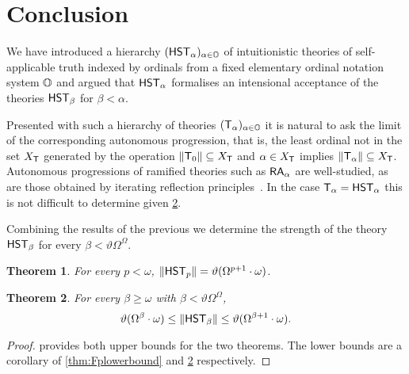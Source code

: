 \documentclass[UKenglish,cleveref,DIV=12]{scrartcl}
\newtheorem{theorem}{Theorem}
\theoremstyle{definition}
\theoremstyle{definition}
\begin{document}
\section{Conclusion}\label{sec:conc}

We have introduced a hierarchy  \( ( \mathsf{HST}_\alpha )_{\alpha \in \mathbb{O} } \) of intuitionistic theories of self-applicable truth indexed by ordinals from a fixed elementary ordinal notation system \( \mathbb{O} \) and argued that \( \mathsf{HST}_{\alpha} \) formalises an intensional acceptance of the theories \( \mathsf{HST}_{\beta} \) for \( \beta < \alpha \).

Presented with such a hierarchy of theories $ ( \mathsf{T}_\alpha )_{\alpha\in\mathbb{O} }$ it is natural to ask the limit of the corresponding
autonomous progression, that is, the least ordinal not in the set $X_{\mathsf{T}}$ generated by the operation $\lVert{\mathsf{T}_0}\rVert\subseteq X_{\mathsf{T}}$ and
$\alpha\in X_{\mathsf{T}}$ implies $\lVert{\mathsf{T}_\alpha}\rVert\subseteq X_{\mathsf{T}}$. 
Autonomous progressions of ramified theories such as $\mathsf{RA}_\alpha$ are well-studied, as are those obtained by
iterating reflection principles~\cite{XX}.
In the case $\mathsf{T}_\alpha=\mathsf{HST}_\alpha$ this is not difficult to determine
given \cref{thm:Fbetastrength}.

Combining the results of the previous  we determine
the strength of the theory $\mathsf{HST}_\beta$ for every $\beta<\vartheta\Omega^\Omega$.
%
\begin{theorem}\label{thm:Fpstrength}
 For every $p<\omega$,
 \(
  \lVert{\mathsf{HST}_p}\rVert=\vartheta(\Omega^{p+1}\cdot\omega)
 \).
\end{theorem}
%
\begin{theorem}\label{thm:Fbetastrength}
 For every $\beta\ge\omega$ with $\beta<\vartheta\Omega^\Omega$,
 \[
  \vartheta(\Omega^\beta\cdot\omega)\le\lVert{\mathsf{HST}_\beta}\rVert\le\vartheta(\Omega^{\beta+1}\cdot\omega).
 \]
\end{theorem}
%
\begin{proof} 
 provides both upper bounds for the two
theorems. 
The lower bounds are a corollary of
\cref{thm:Fplowerbound} and
\cref{thm:Fbetastrength} respectively.
\end{proof}
%
\end{document}
